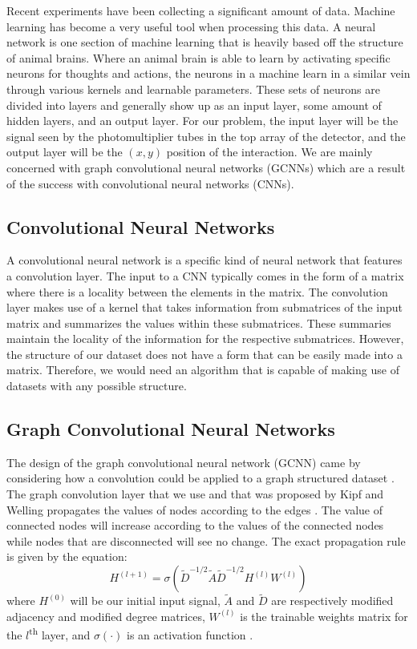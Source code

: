 Recent experiments have been collecting a significant amount of data.
Machine learning has become a very useful tool when processing this data.
A neural network is one section of machine learning that is heavily based off the structure of animal brains.
Where an animal brain is able to learn by activating specific neurons for thoughts and actions, the neurons in a machine learn in a similar vein through various kernels and learnable parameters.
These sets of neurons are divided into layers and generally show up as an input layer, some amount of hidden layers, and an output layer.
For our problem, the input layer will be the signal seen by the photomultiplier tubes in the top array of the detector, and the output layer will be the $(x,y)$ position of the interaction.
We are mainly concerned with graph convolutional neural networks (GCNNs) which are a result of the success with convolutional neural networks (CNNs).
\subsection{Convolutional Neural Networks}
A convolutional neural network is a specific kind of neural network that features a convolution layer.
The input to a CNN typically comes in the form of a matrix where there is a locality between the elements in the matrix.
The convolution layer makes use of a kernel that takes information from submatrices of the input matrix and summarizes the values within these submatrices.
These summaries maintain the locality of the information for the respective submatrices.
However, the structure of our dataset does not have a form that can be easily made into a matrix.
Therefore, we would need an algorithm that is capable of making use of datasets with any possible structure.
\subsection{Graph Convolutional Neural Networks}
The design of the graph convolutional neural network (GCNN) came by considering how a convolution could be applied to a graph structured dataset \cite{GCNN_Kipf}.
The graph convolution layer that we use and that was proposed by Kipf and Welling propagates the values of nodes according to the edges \cite{GCNN_Kipf}.
The value of connected nodes will increase according to the values of the connected nodes while nodes that are disconnected will see no change.
The exact propagation rule is given by the equation:
\[ H^{(l+1)} = \sigma\left( \tilde{D}^{-1/2} \tilde{A} \tilde{D}^{-1/2} H^{(l)} W^{(l)} \right) \]
where $H^{(0)}$ will be our initial input signal, $\tilde{A}$ and $\tilde{D}$ are respectively modified adjacency and modified degree matrices, $W^{(l)}$ is the trainable weights matrix for the $l$\textsuperscript{th} layer, and $\sigma(\cdot)$ is an activation function \cite{GCNN_Kipf}.

